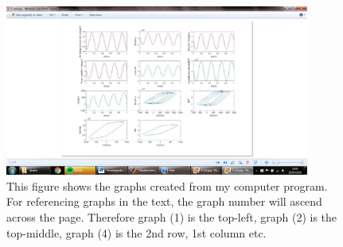 \documentclass[a4paper]{article}\usepackage[english]{babel}
\begin{document}
\begin{figure}
\includegraphics[trim=300 100 300 90,clip,width=10cm,clip,width=\linewidth]{picture8.png}
\caption{\label{fig:picture6}This figure shows the graphs created from my computer program. For referencing graphs in the text, the graph number will ascend across the page. Therefore graph (1) is the top-left, graph (2) is the top-middle, graph (4) is the 2nd row, 1st column etc.}
\end{figure}
\FloatBarrier
\end{document}
